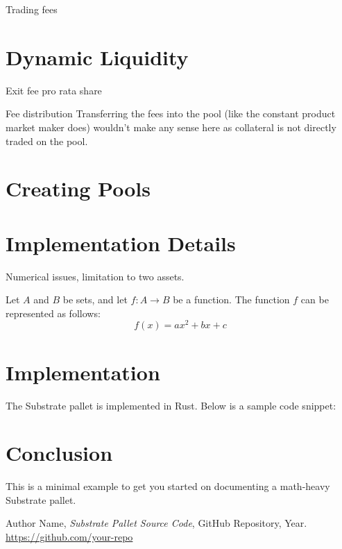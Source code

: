 \documentclass[12pt]{article}
\begin{document}
Trading fees


\section{Dynamic Liquidity}

Exit fee
pro rata share

Fee distribution
Transferring the fees into the pool (like the constant product market maker does) wouldn't make any sense here as collateral is not directly traded on the pool.


\section{Creating Pools}


\section{Implementation Details}

Numerical issues, limitation to two assets.


Let \( A \) and \( B \) be sets, and let \( f: A \to B \) be a function. The function \( f \) can be represented as follows:
\[
f(x) = ax^2 + bx + c
\]

\section{Implementation}
The Substrate pallet is implemented in Rust. Below is a sample code snippet:

\section{Conclusion}
This is a minimal example to get you started on documenting a math-heavy Substrate pallet.


\begin{thebibliography}{9}

  Author Name,
  \emph{Substrate Pallet Source Code},
  GitHub Repository,
  Year.
  \url{https://github.com/your-repo}

\end{thebibliography}
\end{document}
